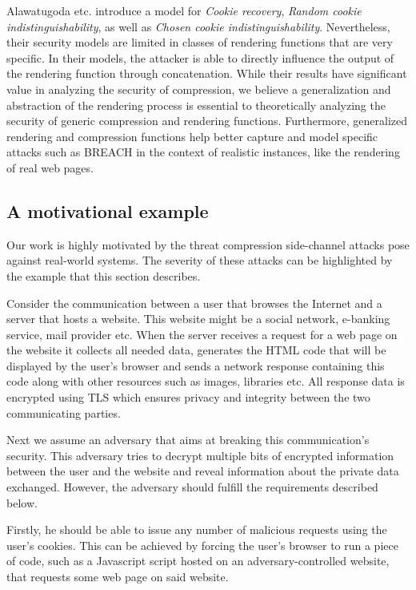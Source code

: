 \documentclass[conference, letterpaper, 10pt]{IEEEtran}
\begin{document}
Alawatugoda etc. \cite{c6} introduce a model for \textit{Cookie recovery},
\textit{Random cookie indistinguishability}, as well as \textit{Chosen cookie indistinguishability}.
Nevertheless, their security models are limited in classes of rendering functions
that are very specific. In their models, the attacker is able to directly influence
the output of the rendering function through concatenation. While their results
have significant value in analyzing the security of compression, we believe
a generalization and abstraction of the rendering process is essential to
theoretically analyzing the security of generic compression and rendering functions.
Furthermore, generalized rendering and compression functions help better
capture and model specific attacks such as BREACH in the context of
realistic instances, like the rendering of real web pages.

\subsection{A motivational example}\label{subsec:example}
Our work is highly motivated by the threat compression side-channel attacks pose
against real-world systems. The severity of these attacks can be highlighted by
the example that this section describes.

Consider the communication between a user that browses the Internet and a server
that hosts a website. This website might be a social network, e-banking service,
mail provider etc. When the server receives a request for a web page on the
website it collects all needed data, generates the HTML code that will be
displayed by the user's browser and sends a network response containing this
code along with other resources such as images, libraries etc. All response data
is encrypted using TLS which ensures privacy and integrity between the two
communicating parties.

Next we assume an adversary that aims at breaking this communication's security.
This adversary tries to decrypt multiple bits of encrypted information between
the user and the website and reveal information about the private data
exchanged. However, the adversary should fulfill the requirements described
below.

Firstly, he should be able to issue any number of malicious requests using the
user's cookies. This can be achieved by forcing the user's browser to run a
piece of code, such as a Javascript script hosted on an adversary-controlled
website, that requests some web page on said website.
\end{document}
